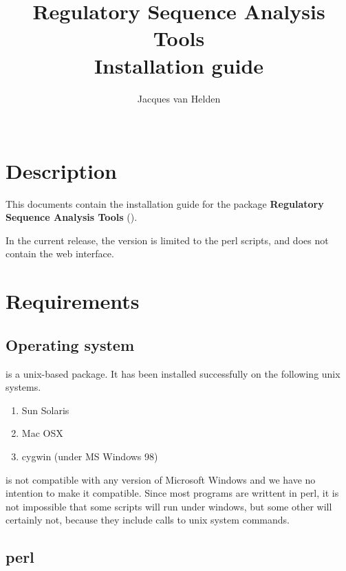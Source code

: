 \documentclass{article}
\begin{document}
\title{Regulatory Sequence Analysis Tools \\
Installation guide}

\author{
	Jacques van Helden \\
	 \\
	\scmb 
}



\maketitle


\section{Description}

This documents contain the installation guide for the package
\textbf{Regulatory Sequence Analysis Tools} (\RSAT).

In the current release, the version is limited to the perl scripts,
and does not contain the web interface.


\section{Requirements}

\subsection{Operating system}

\RSAT is a unix-based package. It has been installed successfully on
the following unix systems.

\begin{enumerate}
\item Sun Solaris
\item Mac OSX
\item cygwin (under MS Windows 98)
\end{enumerate}

\RSAT is not compatible with any version of Microsoft Windows and we
have no intention to make it compatible. Since most programs are
writtent in perl, it is not impossible that some scripts will run
under windows, but some other will certainly not, because they include
calls to unix system commands.

\subsection{perl}
\end{document}
